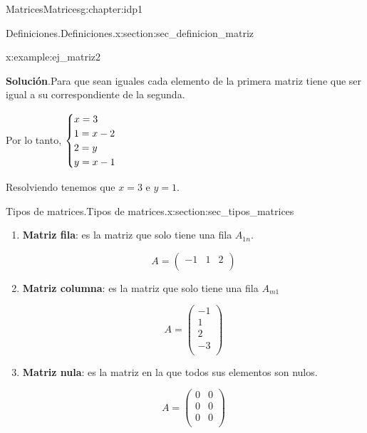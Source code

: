 \documentclass[oneside,12pt,]{book}
\newcommand{\blocktitlefont}{\relax}
\newcommand{\terminology}[1]{\textbf{#1}}
\newcommand{\amp}{&}
\begin{document}
\begin{chapterptx}{Matrices}{}{Matrices}{}{}{g:chapter:idp1}
\begin{sectionptx}{Definiciones.}{}{Definiciones.}{}{}{x:section:sec_definicion_matriz}
\begin{example}{}{x:example:ej_matriz2}
\par\smallskip%
\noindent\textbf{\blocktitlefont Solución}.\hypertarget{g:solution:idp5}{}\quad{}Para que sean iguales cada elemento de la primera matriz tiene que ser igual a su correspondiente de la segunda.%
\par
Por lo tanto, \(\begin{cases} x= 3 \cr 1= x-2 \cr 2= y \cr y=x-1 \end{cases}\)%
\par
Resolviendo tenemos que \(x=3 \) e \(y=1\).%
\end{example}
\end{sectionptx}
%
%
\typeout{************************************************}
\typeout{************************************************}
%
\begin{sectionptx}{Tipos de matrices.}{}{Tipos de matrices.}{}{}{x:section:sec_tipos_matrices}
%
\begin{enumerate}[label=\alph*]
\item{}\terminology{Matriz fila}: es la matriz que solo tiene una fila \(A_{1n}\).%
\par
%
\begin{equation*}
A= \begin{pmatrix}  -1 \amp 1  \amp 2  \\ \end{pmatrix}
\end{equation*}
%
\item{}\terminology{Matriz columna}: es la matriz que solo tiene una fila \(A_{m1}\)%
\par
%
\begin{equation*}
A= \begin{pmatrix}  -1 \\  1  \\  2  \\  -3   \\\end{pmatrix}
\end{equation*}
%
\item{}\terminology{Matriz nula}: es la matriz en la que todos sus elementos son nulos.%
\par
%
\begin{equation*}
A= \begin{pmatrix}  0 \amp 0  \\  0  \amp 0 \\   0 \amp 0 \\\end{pmatrix}
\end{equation*}

\end{enumerate}
\end{sectionptx}
\end{chapterptx}
\end{document}
